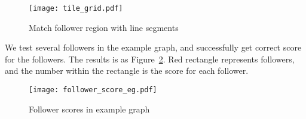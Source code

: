 \begin{figure}[htbp]
	  \centering
	  \texttt{[image: tile\_grid.pdf]}
	  \caption{Match follower region with line segments}
	  \label{tile_grid}
\end{figure}

We test several followers in the example graph, and successfully get correct score for the followers. The results is as Figure~\ref{follower_score_eg}. Red rectangle represents followers, and the number within the rectangle is the score for each follower.

\begin{figure}[htbp]
	  \centering
	  \texttt{[image: follower\_score\_eg.pdf]}
	  \caption{Follower scores in example graph}
	  \label{follower_score_eg}
\end{figure}